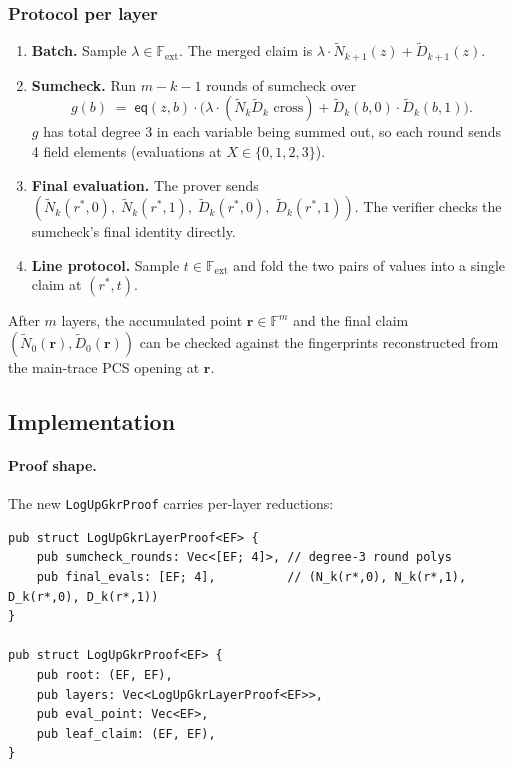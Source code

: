 \subsubsection*{Protocol per layer}
\begin{enumerate}
  \item \textbf{Batch.} Sample $\lambda \in \mathbb{F}_{\mathrm{ext}}$. The
        merged claim is $\lambda \cdot \widetilde{N}_{k+1}(z) + \widetilde{D}_{k+1}(z)$.
  \item \textbf{Sumcheck.} Run $m-k-1$ rounds of sumcheck over
        \[
          g(b) \;=\; \mathsf{eq}(z, b) \cdot
               \bigl(\lambda \cdot (\widetilde{N}_k \widetilde{D}_k \text{ cross})
                     + \widetilde{D}_k(b, 0) \cdot \widetilde{D}_k(b, 1)\bigr).
        \]
        $g$ has total degree 3 in each variable being summed out, so each
        round sends 4 field elements (evaluations at $X \in \{0, 1, 2, 3\}$).
  \item \textbf{Final evaluation.} The prover sends
        $(\widetilde{N}_k(r^*, 0),\; \widetilde{N}_k(r^*, 1),\;
          \widetilde{D}_k(r^*, 0),\; \widetilde{D}_k(r^*, 1))$. The
        verifier checks the sumcheck's final identity directly.
  \item \textbf{Line protocol.} Sample $t \in \mathbb{F}_{\mathrm{ext}}$
        and fold the two pairs of values into a single claim at $(r^*, t)$.
\end{enumerate}

After $m$ layers, the accumulated point $\mathbf{r} \in \mathbb{F}^m$ and
the final claim $(\widetilde{N}_0(\mathbf{r}), \widetilde{D}_0(\mathbf{r}))$
can be checked against the fingerprints reconstructed from the
main-trace PCS opening at $\mathbf{r}$.

\subsection{Implementation}

\paragraph{Proof shape.} The new \texttt{LogUpGkrProof} carries per-layer
reductions:
\begin{verbatim}
pub struct LogUpGkrLayerProof<EF> {
    pub sumcheck_rounds: Vec<[EF; 4]>, // degree-3 round polys
    pub final_evals: [EF; 4],          // (N_k(r*,0), N_k(r*,1), D_k(r*,0), D_k(r*,1))
}

pub struct LogUpGkrProof<EF> {
    pub root: (EF, EF),
    pub layers: Vec<LogUpGkrLayerProof<EF>>,
    pub eval_point: Vec<EF>,
    pub leaf_claim: (EF, EF),
}
\end{verbatim}

